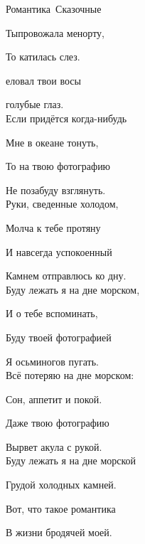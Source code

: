 \documentclass[11pt,a5paper]{book}
\begin{document}
\begin{song}{Романтика}{}{~}{Сказочные}{}{}

Тыпровожала менорту,\par
То катилась слез.\par
{}еловал твои восы\par
{}голубые глаз.\\

Если придётся когда-нибудь\par
Мне в океане тонуть,\par
То на твою фотографию\par
Не позабуду взглянуть.\\

Руки, сведенные холодом,\par
Молча к тебе протяну\par
И навсегда успокоенный\par
Камнем отправлюсь ко дну.\\

Буду лежать я на дне морском,\par
И о тебе вспоминать,\par
Буду твоей фотографией\par
Я осьминогов пугать.\\

Всё потеряю на дне морском:\par
Сон, аппетит и покой.\par
Даже твою фотографию\par
Вырвет акула с рукой.\\

Буду лежать я на дне морской\par
Грудой холодных камней.\par
Вот, что такое романтика\par
В жизни бродячей моей.\\
\end{song}
\end{document}
